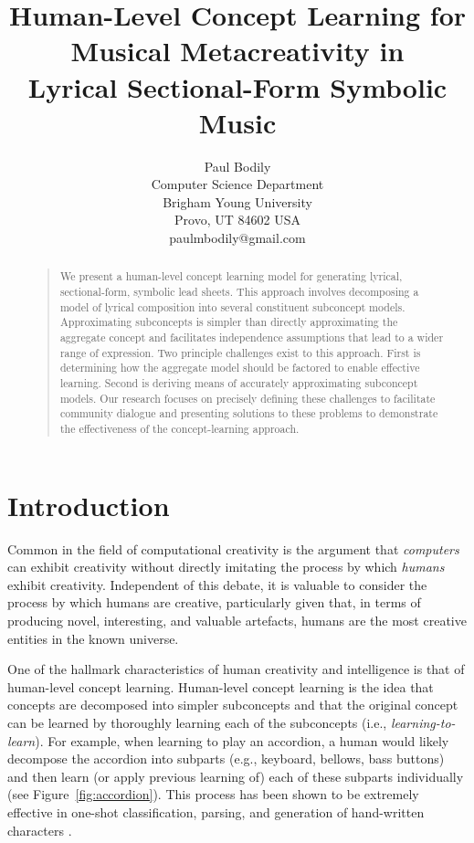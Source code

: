 \documentclass[letterpaper]{article}
\title{Human-Level Concept Learning for Musical Metacreativity in \\Lyrical Sectional-Form Symbolic Music}
\author{Paul Bodily\\
Computer Science Department\\
Brigham Young University\\
Provo, UT 84602  USA\\
paulmbodily@gmail.com\\
}
\begin{document}
 
\maketitle
\begin{abstract}
\begin{quote}
We present a human-level concept learning model for generating lyrical, sectional-form, symbolic lead sheets. This approach involves decomposing a model of lyrical composition into several constituent subconcept models. Approximating subconcepts is simpler than directly approximating the aggregate concept and facilitates independence assumptions that lead to a wider range of expression. Two principle challenges exist to this approach. First is determining how the aggregate model should be factored to enable effective learning. Second is deriving means of accurately approximating subconcept models. Our research focuses on precisely defining these challenges to facilitate community dialogue and presenting solutions to these problems to demonstrate the effectiveness of the concept-learning approach.
\end{quote}
\end{abstract}

\section{Introduction}
Common in the field of computational creativity is the argument that \emph{computers} can exhibit creativity without directly imitating the process by which \emph{humans} exhibit creativity. Independent of this debate, it is valuable to consider the process by which humans are creative, particularly given that, in terms of producing novel, interesting, and valuable artefacts, humans are the most creative entities in the known universe.

One of the hallmark characteristics of human creativity and intelligence is that of human-level concept learning. Human-level concept learning is the idea that concepts are decomposed into simpler subconcepts and that the original concept can be learned by thoroughly learning each of the subconcepts (i.e., \emph{learning-to-learn}). For example, when learning to play an accordion, a human would likely decompose the accordion into subparts (e.g., keyboard, bellows, bass buttons) and then learn (or apply previous learning of) each of these subparts individually (see Figure~\ref{fig:accordion}). This process has been shown to be extremely effective in one-shot classification, parsing, and generation of hand-written characters \cite{lake2015human}.
\end{document}
